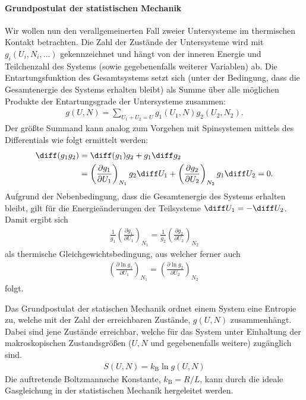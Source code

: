 \paragraph*{Grundpostulat der statistischen Mechanik}
Wir wollen nun den verallgemeinerten Fall zweier Untersysteme im thermischen Kontakt betrachten. Die Zahl der Zustände der Untersysteme wird mit $g_i(U_i,N_i,...)$ gekennzeichnet und hängt von der inneren Energie und Teilchenzahl des Systems (sowie gegebenenfalls weiterer Variablen) ab. Die Entartungsfunktion des Gesamtsystems setzt sich (unter der Bedingung, dass die Gesamtenergie des Systems erhalten bleibt) als Summe über alle möglichen Produkte der Entartungsgrade der Untersysteme zusammen: 
\begin{align*}
    g(U,N)=\sum_{U_1+U_2=U}g_1(U_1,N)g_2(U_2,N_2).
\end{align*}
Der größte Summand kann analog zum Vorgehen mit Spinsystemen mittels des Differentials wie folgt ermittelt werden:
\begin{align*}
    \diff(g_1g_2)&=\diff(g_1)g_2+g_1\diff g_2\\
    &=\left(\frac{\partial g_1}{\partial U_1}\right)_{N_1}g_2\diff U_1+\left(\frac{\partial g_2}{\partial U_2}\right)_{N_2}g_1\diff U_2=0.
\end{align*}
Aufgrund der Nebenbedingung, dass die Gesamtenergie des Systems erhalten bleibt, gilt für die Energieänderungen der Teilsysteme $\diff U_1=-\diff U_2$.
Damit ergibt sich 
\begin{align*}
    \frac{1}{g_1}\left(\frac{\partial g_1}{\partial U_1}\right)_{N_1}=\frac{1}{g_2}\left(\frac{\partial g_2}{\partial U_2}\right)_{N_2}
\end{align*}
als thermische Gleichgewichtsbedingung, aus welcher ferner auch
\begin{align*}
    \boxed{\left(\frac{\partial \ln g_1}{\partial U_1}\right)_{N_1}=\left(\frac{\partial \ln g_2}{\partial U_2}\right)_{N_2}}\:
\end{align*}
folgt.
\begin{postulate}
    \label{post:GrundpostulatStatMech}
     Das Grundpostulat der statischen Mechanik ordnet einem System eine Entropie zu, welche mit der Zahl der erreichbaren Zustände, $g(U,N)$ zusammenhängt. Dabei sind jene Zustände erreichbar, welche für das System unter Einhaltung der makroskopischen Zustandsgrößen ($U,N$ und gegebenenfalls weitere) zugänglich sind.
    \begin{align*}
        \boxed{S(U,N)=k_\mathrm{B}\ln g(U,N)}
    \end{align*}
    Die auftretende Boltzmannsche Konstante, $k_\mathrm{B}=R/L$, kann durch die ideale Gasgleichung in der statistischen Mechanik hergeleitet werden.
\end{postulate}
